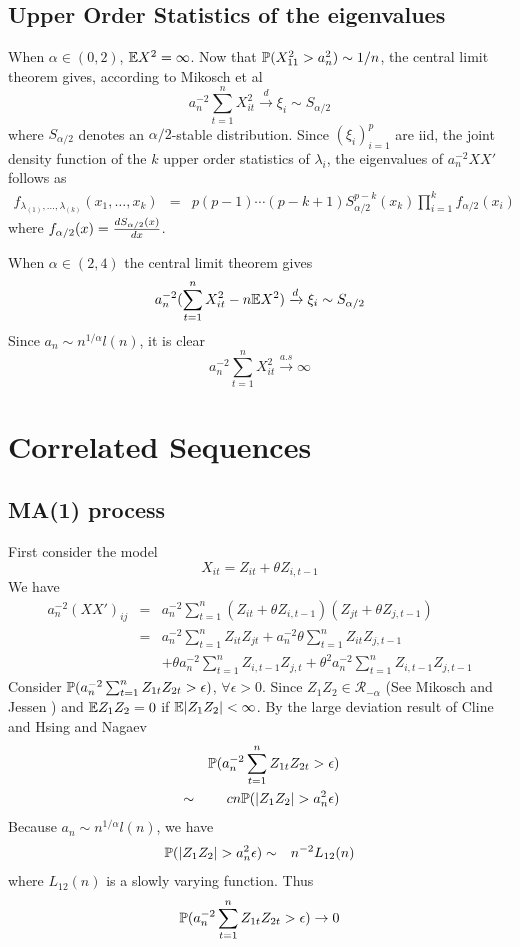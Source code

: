 \documentclass{article}
\begin{document}
\subsection{Upper Order Statistics of the eigenvalues}
When $\alpha \in (0,2)$, $\E X^2 = \infty$. Now that
$\P(X_{11}^2 > a_n^2) \sim 1/n$, the central limit theorem 
gives, according to Mikosch et al\cite{Embrechts1997} 
\[
a_n^{-2} \sum_{t=1}^n X_{it}^2 \xrightarrow{d} \xi_i \sim S_{\alpha/2}
\]
where $S_{\alpha/2}$ denotes an $\alpha/2$-stable distribution.
Since $(\xi_i)_{i=1}^p$ are iid, the joint density function of the $k$
upper order statistics of $\lambda_i$, the eigenvalues of $a_n^{-2} X X'$
follows as
\begin{eqnarray*}
  f_{\lambda_{(1)}, \dots, \lambda_{(k)}}(x_1, \dots, x_k) &=&
  p(p-1)\cdots(p-k+1) S_{\alpha/2}^{p-k}(x_k) \prod_{i=1}^k
  f_{\alpha/2}(x_i)
\end{eqnarray*}
where $f_{\alpha/2}(x) = {d S_{\alpha/2}(x) \over dx}$.

When $\alpha \in (2,4)$ the central limit theorem gives
\[
a_n^{-2} (\sum_{t=1}^n X_{it}^2 - n \E X^2)\xrightarrow{d}
\xi_i \sim S_{\alpha/2}
\]
Since $a_n \sim n^{1/\alpha} l(n)$, it is clear
\[
a_n^{-2} \sum_{t=1}^n X_{it}^2 \xrightarrow{a.s}\infty
\]

\section{Correlated Sequences}
\subsection{MA(1) process}
First consider the model
\[
X_{it} = Z_{it} + \theta Z_{i,t-1}
\]
We have
\begin{eqnarray*}
  a_n^{-2}(XX')_{ij} &=& a_n^{-2} \sum_{t=1}^n (Z_{it} + \theta
  Z_{i,t-1}) (Z_{jt} + \theta Z_{j,t-1}) \\
  &=& a_n^{-2} \sum_{t=1}^n Z_{it} Z_{jt} + a_n^{-2} \theta \sum_{t=1}^n
  Z_{it} Z_{j,t-1} \\
  && +\theta a_n^{-2} \sum_{t=1}^n Z_{i, t-1}
  Z_{j,t} + \theta^2 a_n^{-2} \sum_{t=1}^n Z_{i,t-1} Z_{j,t-1}
\end{eqnarray*}
Consider $\P(a_n^{-2} \sum_{t=1}^n Z_{1t} Z_{2t} > \epsilon)$,
$\forall \epsilon>0$. Since $Z_1 Z_2 \in \mathcal R_{-\alpha}$ (See
Mikosch and Jessen \cite{JessenMikosch2006}) and $\E Z_1 Z_2 = 0$ if
$\E|Z_1Z_2| < \infty$. By the large deviation result of Cline and
Hsing \cite{ClingHsing1998} and Nagaev \cite{nagaev1979}
\begin{eqnarray*}
  && \P(a_n^{-2} \sum_{t=1}^n Z_{1t} Z_{2t} > \epsilon)  \\
  &\sim& c n \P(|Z_1 Z_2| > a_n^{2} \epsilon)  \\
\end{eqnarray*}
Because $a_n \sim n^{1/\alpha} l(n)$, we have
\begin{eqnarray*}
  \P(|Z_1 Z_2| > a_n^{2} \epsilon) &\sim& n^{-2} L_{12}(n)
\end{eqnarray*}
where $L_{12}(n)$ is a slowly varying function. Thus
\[
\P(a_n^{-2} \sum_{t=1}^n Z_{1t} Z_{2t} > \epsilon) \to 0
\]
\end{document}
